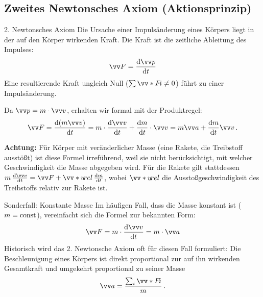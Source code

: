 \subsection{Zweites Newtonsches Axiom (Aktionsprinzip)}\label{subsec: zweites_axiom}
\begin{importantbox}[]{2. Newtonsches Axiom}
    Die Ursache einer Impulsänderung eines Körpers liegt in der auf den Körper wirkenden Kraft. Die Kraft ist die zeitliche Ableitung des Impulses:
    \begin{equation}\label{eq: zweites_newtonsches_axiom_kraft}
        \ivec{F} = \frac{\dd\ivec{p}}{\dd t}
    \end{equation}
    Eine resultierende Kraft ungleich Null ($\sum \ivecS{F}{i} \neq 0$) führt zu einer Impulsänderung.
\end{importantbox}

Da $\ivec{p} = m\cdot\ivec{v}$, erhalten wir formal mit der Produktregel:
\begin{equation}\label{eq: newton2_rakete}
    \ivec{F} = \frac{\dd(m\ivec{v})}{\dd t} = m \cdot \frac{\dd \ivec{v}}{\dd t} + \frac{\dd m}{\dd t} \cdot \ivec{v} = m\ivec{a} + \frac{\dd m}{\dd t}\ivec{v} \mDot
\end{equation}

\textbf{Achtung:} Für Körper mit veränderlicher Masse (\zB eine Rakete, die Treibstoff ausstößt) ist diese Formel irreführend, weil sie nicht berücksichtigt, mit welcher Geschwindigkeit die Masse abgegeben wird. Für die Rakete gilt stattdessen $m\,\frac{\dd\ivec{v}}{\dd t} = \ivec{F} + \ivecS{u}{rel}\,\frac{\dd m}{\dd t}$, wobei $\ivecS{u}{rel}$ die Ausstoßgeschwindigkeit des Treibstoffs relativ zur Rakete ist.

\begin{rememberbox}{Sonderfall: Konstante Masse}
    Im häufigen Fall, dass die Masse konstant ist ($m = \mathrm{const}$), vereinfacht sich die Formel zur bekannten Form:
    \begin{equation}\label{eq: zweites_newtonsche_axiom_F_equals_ma}
        \ivec{F} = m\cdot\frac{\dd\ivec{v}}{\dd t} = m\cdot\ivec{a} 
    \end{equation}
    Historisch wird das 2. Newtonsche Axiom oft für diesen Fall formuliert: Die Beschleunigung eines Körpers ist direkt proportional zur auf ihn wirkenden Gesamtkraft und umgekehrt proportional zu seiner Masse
    \begin{equation}
        \ivec{a} = \frac{\sum_{i}\ivecS{F}{i}}{m} \mDot
    \end{equation}
\end{rememberbox}


